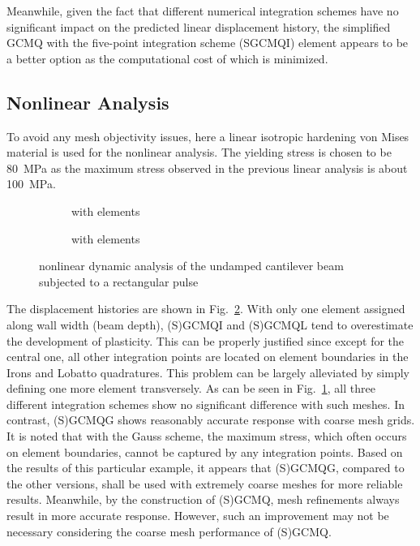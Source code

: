 \documentclass[3p,sort&compress,review,11pt,fleqn]{elsarticle}
\newcommand*{\figref}[1]{Fig.~\ref{#1}}
\begin{document}
Meanwhile, given the fact that different numerical integration schemes have no significant impact on the predicted linear displacement history, the simplified GCMQ with the five-point integration scheme (SGCMQI) element appears to be a better option as the computational cost of which is minimized.
\subsection{Nonlinear Analysis}
To avoid any mesh objectivity issues, here a linear isotropic hardening von Mises material is used for the nonlinear analysis. The yielding stress is chosen to be \SI{80}{\mega\pascal} as the maximum stress observed in the previous linear analysis is about \SI{100}{\mega\pascal}.

\begin{figure}[htb]
\centering\scriptsize
\begin{subfigure}{.49\textwidth}\centering

\caption{with  elements}
\end{subfigure}\hfill
\begin{subfigure}{.49\textwidth}\centering

\caption{with  elements}\label{fig:cantilever_disp_nonlinear_dense}
\end{subfigure}
\caption{nonlinear dynamic analysis of the undamped cantilever beam subjected to a rectangular pulse}\label{fig:cantilever_disp_nonlinear}
\end{figure}
The displacement histories are shown in \figref{fig:cantilever_disp_nonlinear}. With only one element assigned along wall width (beam depth), (S)GCMQI and (S)GCMQL tend to overestimate the development of plasticity. This can be properly justified since except for the central one, all other integration points are located on element boundaries in the Irons and Lobatto quadratures. This problem can be largely alleviated by simply defining one more element transversely. As can be seen in \figref{fig:cantilever_disp_nonlinear_dense}, all three different integration schemes show no significant difference with such meshes. In contrast, (S)GCMQG shows reasonably accurate response with coarse mesh grids. It is noted that with the Gauss scheme, the maximum stress, which often occurs on element boundaries, cannot be captured by any integration points. Based on the results of this particular example, it appears that (S)GCMQG, compared to the other versions, shall be used with extremely coarse meshes for more reliable results. Meanwhile, by the construction of (S)GCMQ, mesh refinements always result in more accurate response. However, such an improvement may not be necessary considering the coarse mesh performance of (S)GCMQ.
\end{document}
